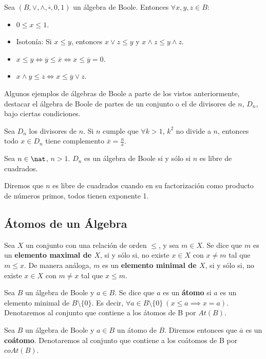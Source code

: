 \smallskip
\begin{properties}
    Sea $(B, \lor, \land, \overline{\square}, 0, 1)$ un álgebra de Boole. Entonces $\forall x,y,z \in B$:
    \begin{itemize}
        \item $0 \leq x \leq 1$.
        \item Isotonía: Si $x \leq y$, entonces $x \lor z \leq y$ y $x \land z \leq y \land z$.
        \item $x\leq y \Longleftrightarrow \overline{y} \leq \overline{x} \Longleftrightarrow x \leq \overline{y} = 0$.
        \item $x \land y \leq z \Longleftrightarrow x \leq \overline{y} \lor z$.
    \end{itemize}
\end{properties}
\begin{ejemplo}
    Algunos ejemplos de álgebras de Boole a parte de los vistos anteriormente, destacar el álgebra de Boole de partes de un conjunto o el de divisores de $n$,
    $D_n$, bajo ciertas condiciones.
\end{ejemplo}

\begin{nprop}
    Sea $D_n$ los divisores de $n$. Si $n$ cumple que $\forall k > 1$, $k^2$ no divide a $n$, entonces todo $x \in D_n$ tiene complemento $\overline{x} = \frac{n}{x}$.
\end{nprop}
\begin{nprop}
    Sea $n \in \nat$, $n > 1$. $D_n$ es un álgebra de Boole si y sólo si $n$ es libre de cuadrados.
\end{nprop}
\begin{nota}
    Diremos que $n$ es libre de cuadrados cuando en su factorización como producto de números primos, todos tienen exponente 1.
\end{nota}

\subsection{Átomos de un Álgebra}
\begin{ndef}
    Sea $X$ un conjunto con una relación de orden $\leq$, y sea $m \in X$. Se dice que $m$ es un \textbf{elemento maximal de $X$}, si y sólo si, no existe $x \in X$ con $x \neq m$ tal que $m \leq x$.
    De manera análoga, $m$ es un \textbf{elemento minimal de $X$}, si y sólo si, no existe $x \in X$ con $m \neq x$ tal que $x \leq m$.
\end{ndef}
\begin{ndef}[Átomo]
    Sea $B$ un álgebra de Boole y $a \in B$. Se dice que $a$ es un \textbf{átomo} si $a$ es un elemento minimal de $B \setminus \{0\}$. Es decir,
    $\forall a \in B \setminus \{0\} \ (x \leq a \implies x = a)$. Denotaremos al conjunto que contiene a los átomos de B por $At(B)$.
\end{ndef}
\begin{ndef}[Coátomo]
    Sea $B$ un álgebra de Boole y $a \in B$ un átomo de $B$. Diremos entonces que $\overline{a}$ es un \textbf{coátomo}.
    Denotaremos al conjunto que contiene a los coátomos de B por $coAt(B)$.
\end{ndef}

